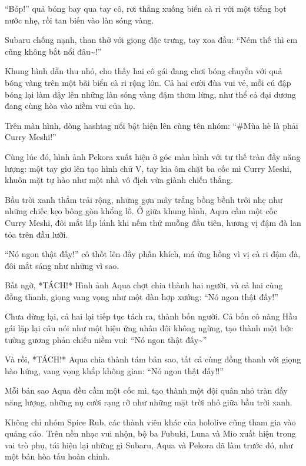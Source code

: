 \documentclass[../main.tex]{subfiles}
\begin{document}
``Bóp!'' quả bóng bay qua tay cô, rơi thẳng xuống biển cà ri với một tiếng bọt nước nhẹ, rồi tan biến vào làn sóng vàng.

Subaru chống nạnh, than thở với giọng đặc trưng, tay xoa đầu: ``Ném thế thì em cũng không bắt nổi đâu\~{}!''

Khung hình dần thu nhỏ, cho thấy hai cô gái đang chơi bóng chuyền với quả bóng vàng trên một bãi biển cà ri rộng lớn. Cả hai cười đùa vui vẻ, mỗi cú đập bóng lại làm dậy lên những làn sóng vàng đậm thơm lừng, như thể cả đại dương đang cùng hòa vào niềm vui của họ.

Trên màn hình, dòng hashtag nổi bật hiện lên cùng tên nhóm: ``\#Mùa hè là phải Curry Meshi!''

Cùng lúc đó, hình ảnh Pekora xuất hiện ở góc màn hình với tư thế tràn đầy năng lượng: một tay giơ lên tạo hình chữ V, tay kia ôm chặt ba cốc mì Curry Meshi, khuôn mặt tự hào như một nhà vô địch vừa giành chiến thắng.


Bầu trời xanh thẳm trải rộng, những gợn mây trắng bồng bềnh trôi nhẹ như những chiếc kẹo bông gòn khổng lồ. Ở giữa khung hình, Aqua cầm một cốc Curry Meshi, đôi mắt lấp lánh khi nếm thử muỗng đầu tiên, hương vị đậm đà lan tỏa trên đầu lưỡi.

``Nó ngon thật đấy!'' cô thốt lên đầy phấn khích, má ửng hồng vì vị cà ri đậm đà, đôi mắt sáng như những vì sao.

Bất ngờ, *TÁCH!* Hình ảnh Aqua chợt chia thành hai người, và cả hai cùng đồng thanh, giọng vang vọng như một dàn hợp xướng: ``Nó ngon thật đấy!''

Chưa dừng lại, cả hai lại tiếp tục tách ra, thành bốn người. Cả bốn cô nàng Hầu gái lặp lại câu nói như một hiệu ứng nhân đôi không ngừng, tạo thành một bức tường gương phản chiếu niềm vui: ``Nó ngon thật đấy\~{}''

Và rồi, *TÁCH!* Aqua chia thành tám bản sao, tất cả cùng đồng thanh với giọng hào hứng, vang vọng khắp không gian: ``Nó ngon thật đấy!!''

Mỗi bản sao Aqua đều cầm một cốc mì, tạo thành một đội quân nhỏ tràn đầy năng lượng, những nụ cười rạng rỡ như những mặt trời nhỏ giữa bầu trời xanh.


Không chỉ nhóm Spice Rub, các thành viên khác của hololive cũng tham gia vào quảng cáo. Trên nền nhạc vui nhộn, bộ ba Fubuki, Luna và Mio xuất hiện trong vai trò phụ, tái hiện lại những gì Subaru, Aqua và Pekora đã làm trước đó, như một bản hòa tấu hoàn chỉnh.
\end{document}
